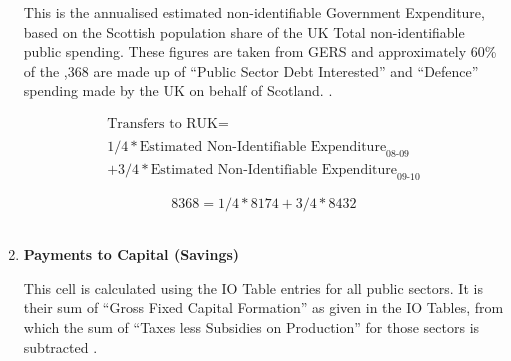 \begin{enumerate}
This is the annualised estimated non-identifiable Government Expenditure, based on the Scottish population share of the UK Total non-identifiable public spending. These figures are taken from GERS and approximately 60\% of the ,368 are made up of ``Public Sector Debt Interested'' and ``Defence'' spending made by the UK on behalf of Scotland. \cite{ScotGov2013b}.

\begin{equation}
\begin{split}
\text{Transfers to RUK} =  \\ \\
1/4*\text{Estimated Non-Identifiable Expenditure}_\text{08-09}\\
+3/4*\text{Estimated Non-Identifiable Expenditure}_\text{09-10}
\end{split} \label{eq:2.5.45}
\end{equation}

\begin{equation} \nonumber
8368 = 1/4*8174+3/4*8432
\end{equation}\\

\newpage

\item \textbf {Payments to Capital (Savings)}

This cell is calculated using the IO Table entries for all public sectors. It is their sum of ``Gross Fixed Capital Formation''  as given in the IO Tables, from which the sum of ``Taxes less Subsidies on Production'' for those sectors is subtracted \cite{ScotGov2013a}.\\


\end{enumerate}
